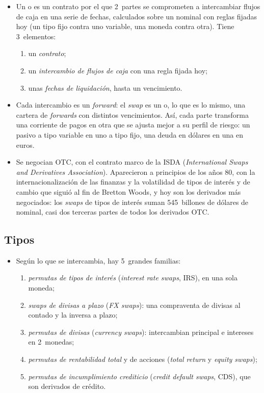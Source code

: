 \documentclass[11pt]{article}
\begin{document}
\begin{itemize}
\item Un  o  es un contrato por el que 2~partes se comprometen a intercambiar flujos de caja en una serie de fechas, calculados sobre un nominal con reglas fijadas hoy (un tipo fijo contra uno variable, una moneda contra otra). Tiene 3~elementos:
  \begin{enumerate}
  \item un \emph{contrato};
  \item un \emph{intercambio de flujos de caja} con una regla fijada hoy;
  \item unas \emph{fechas de liquidación}, hasta un vencimiento.
  \end{enumerate}
\item Cada intercambio es un \emph{forward}: el \emph{swap} es un  o, lo que es lo mismo, una cartera de \emph{forwards} con distintos vencimientos. Así, cada parte transforma una corriente de pagos en otra que se ajusta mejor a su perfil de riesgo: un pasivo a tipo variable en uno a tipo fijo, una deuda en dólares en una en euros.
\item Se negocian OTC, con el contrato marco de la ISDA (\emph{International Swaps and Derivatives Association}). Aparecieron a principios de los años 80\nocite{Hull2022Options}, con la internacionalización de las finanzas y la volatilidad de tipos de interés y de cambio que siguió al fin de Bretton Woods, y hoy son los derivados más negociados: los \emph{swaps} de tipos de interés suman 545~billones de dólares de nominal, casi dos terceras partes de todos los derivados OTC\nocite{BIS2026OTCDerivados,ISDA2026KeyTrends}.
\end{itemize}

\subsection{Tipos}\label{sec:tipos-swaps}

\begin{itemize}
\item Según lo que se intercambia, hay 5~grandes familias:
  \begin{enumerate}
  \item \emph{permutas de tipos de interés} (\emph{interest rate swaps}, IRS), en una sola moneda;
  \item \emph{swaps de divisas a plazo} (\emph{FX swaps}): una compraventa de divisas al contado y la inversa a plazo;
  \item \emph{permutas de divisas} (\emph{currency swaps}): intercambian principal e intereses en 2~monedas;
  \item \emph{permutas de rentabilidad total} y de acciones (\emph{total return} y \emph{equity swaps});
  \item \emph{permutas de incumplimiento crediticio} (\emph{credit default swaps}, CDS), que son derivados de crédito.
  \end{enumerate}
\end{itemize}
\end{document}
